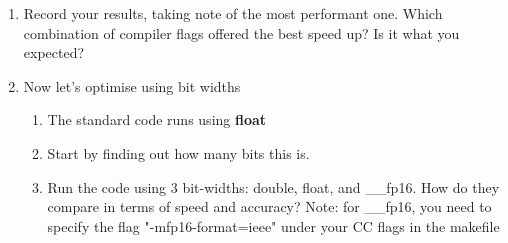\begin{enumerate}
\begin{enumerate}
\begin{table}[H]
\begin{tabular}{|l|l|}
        \end{tabular}
        \end{table}
    \end{enumerate}
    \item Record your results, taking note of the most performant one. Which combination of compiler flags offered the best speed up? Is it what you expected?
    \item Now let's optimise using bit widths
    \begin{enumerate}
        \item The standard code runs using \textbf{float}
        \item Start by finding out how many bits this is.
        \item Run the code using 3 bit-widths: double, float, and \_\_fp16. How do they compare in terms of speed and accuracy? Note: for \_\_fp16, you need to specify the flag "-mfp16-format=ieee" under your \textdollar CC flags in the makefile
    \end{enumerate}

\end{enumerate}
